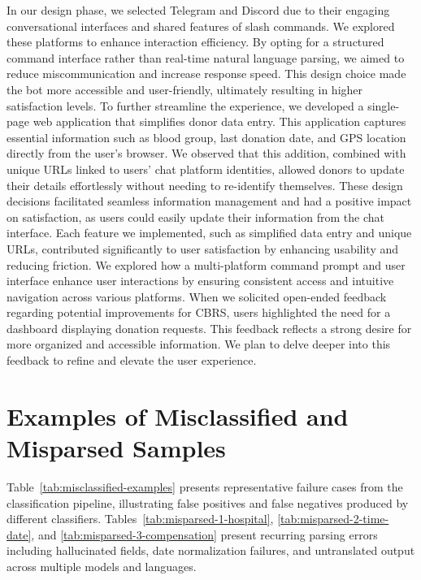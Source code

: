 \documentclass[11pt]{article}
\begin{document}
In our design phase, we selected Telegram and Discord due to their engaging conversational interfaces and shared features of slash commands. We explored these platforms to enhance interaction efficiency. By opting for a structured command interface rather than real-time natural language parsing, we aimed to reduce miscommunication and increase response speed. This design choice made the bot more accessible and user-friendly, ultimately resulting in higher satisfaction levels. To further streamline the experience, we developed a single-page web application that simplifies donor data entry. This application captures essential information such as blood group, last donation date, and GPS location directly from the user’s browser. We observed that this addition, combined with unique URLs linked to users’ chat platform identities, allowed donors to update their details effortlessly without needing to re-identify themselves. These design decisions facilitated seamless information management and had a positive impact on satisfaction, as users could easily update their information from the chat interface. Each feature we implemented, such as simplified data entry and unique URLs, contributed significantly to user satisfaction by enhancing usability and reducing friction. We explored how a multi-platform command prompt and user interface enhance user interactions by ensuring consistent access and intuitive navigation across various platforms. When we solicited open-ended feedback regarding potential improvements for CBRS, users highlighted the need for a dashboard displaying donation requests. This feedback reflects a strong desire for more organized and accessible information. We plan to delve deeper into this feedback to refine and elevate the user experience.


\section{Examples of Misclassified and Misparsed Samples}

Table~\ref{tab:misclassified-examples} presents representative failure cases from the classification pipeline, illustrating false positives and false negatives produced by different classifiers. Tables~\ref{tab:misparsed-1-hospital}, \ref{tab:misparsed-2-time-date}, and \ref{tab:misparsed-3-compensation} present recurring parsing errors including hallucinated fields, date normalization failures, and untranslated output across multiple models and languages.
\end{document}
